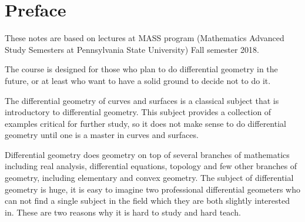 
\chapter*{Preface}
 
These notes are based on lectures at MASS program (Mathematics Advanced Study Semesters at Pennsylvania State University) Fall semester 2018.

The course is designed for those who plan to do differential geometry in the future,
or at least who want to have a solid ground to decide not to do it.

The differential geometry of curves and surfaces is a classical subject that is introductory to differential geometry.
This subject provides a collection of examples critical for further study, so it does not make sense to do differential geometry until one is a master in curves and surfaces.

Differential geometry does geometry on top of several branches of mathematics including real analysis, differential equations, topology and few other branches of geometry, including elementary and convex geometry.
The subject of differential geometry is huge,
it is easy to imagine two professional differential geometers who can not find a single subject in the field which they are both slightly interested in.
These are two reasons why it is hard to study and hard teach.


